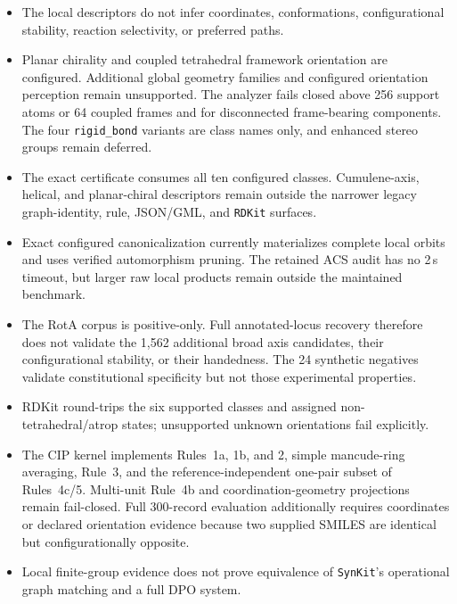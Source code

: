 \documentclass[pdflatex,sn-mathphys-num,referee,lineno]{sn-jnl}
\newcommand{\synkit}{\texttt{SynKit}\xspace}
\newcommand{\rdkit}{\texttt{RDKit}\xspace}
\newcommand{\code}[1]{\texttt{#1}}
\theoremstyle{plain}
\theoremstyle{remark}
\theoremstyle{definition}
\begin{document}
\begin{itemize}
  \item The local descriptors do not infer coordinates, conformations,
        configurational stability, reaction selectivity, or preferred paths.
  \item Planar chirality and coupled tetrahedral framework orientation are
        configured. Additional global geometry families and configured
        orientation perception remain unsupported. The analyzer fails closed
        above 256 support atoms or 64 coupled frames and for disconnected
        frame-bearing components. The four
        \code{rigid\_bond} variants are class
        names only, and enhanced stereo groups remain deferred.
  \item The exact certificate consumes all ten configured classes.
        Cumulene-axis, helical, and planar-chiral descriptors remain outside
        the narrower legacy graph-identity, rule, JSON/GML, and \rdkit{}
        surfaces.
  \item Exact configured canonicalization currently materializes complete
        local orbits and uses verified automorphism pruning.  The retained ACS
        audit has no 2\,s timeout, but larger raw local products remain outside
        the maintained benchmark.
\item The RotA corpus is positive-only.  Full annotated-locus recovery therefore
      does not validate the 1,562 additional broad axis candidates, their
      configurational stability, or their handedness.  The 24 synthetic
      negatives validate constitutional specificity but not those experimental
      properties.
  \item RDKit round-trips the six supported classes and assigned
        non-tetrahedral/atrop states; unsupported unknown orientations fail
        explicitly.
  \item The CIP kernel implements Rules~1a, 1b, and 2, simple mancude-ring
        averaging, Rule~3, and the reference-independent one-pair subset of
        Rules~4c/5. Multi-unit Rule~4b and coordination-geometry projections
        remain fail-closed.  Full 300-record evaluation additionally requires
        coordinates or declared orientation evidence because two supplied
        SMILES are identical but configurationally opposite.
  \item Local finite-group evidence does not prove equivalence of \synkit's
        operational graph matching and a full DPO system.
\end{itemize}
\end{document}

